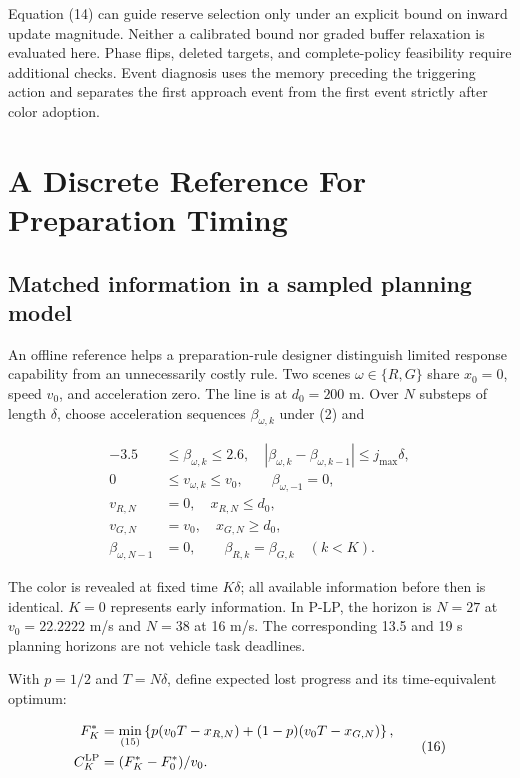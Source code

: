 \documentclass[letterpaper,journal]{IEEEtran}
\begin{document}
Equation (14) can guide reserve selection only under an explicit bound on inward update magnitude. Neither a calibrated bound nor graded buffer relaxation is evaluated here. Phase flips, deleted targets, and complete-policy feasibility require additional checks. Event diagnosis uses the memory preceding the triggering action and separates the first approach event from the first event strictly after color adoption.

\section{A Discrete Reference For Preparation Timing}

\subsection{Matched information in a sampled planning model}

An offline reference helps a preparation-rule designer distinguish limited response capability from an unnecessarily costly rule. Two scenes \(\omega\in\{R,G\}\) share \(x_0=0\), speed \(v_0\), and acceleration zero. The line is at \(d_0=200\) m. Over \(N\) substeps of length \(\delta\), choose acceleration sequences \(\beta_{\omega,k}\) under (2) and

\[\begin{aligned}
-3.5&\le\beta_{\omega,k}\le2.6,\quad
|\beta_{\omega,k}-\beta_{\omega,k-1}|\le j_{\max}\delta,\\
0&\le v_{\omega,k}\le v_0,\qquad \beta_{\omega,-1}=0,\\
v_{R,N}&=0,\quad x_{R,N}\le d_0,\\
v_{G,N}&=v_0,\quad x_{G,N}\ge d_0,\\
\beta_{\omega,N-1}&=0,\qquad
\beta_{R,k}=\beta_{G,k}\quad(k<K).
\end{aligned}\tag{15}\]

The color is revealed at fixed time \(K\delta\); all available information before then is identical. \(K=0\) represents early information. In P-LP, the horizon is \(N=27\) at \(v_0=22.2222\) m/s and \(N=38\) at 16 m/s. The corresponding 13.5 and 19 s planning horizons are not vehicle task deadlines.

With \(p=1/2\) and \(T=N\delta\), define expected lost progress and its time-equivalent optimum:

\[\begin{aligned}
F_K^*&=\min_{\text{(15)}}\left\{
p(v_0T-x_{R,N})+(1-p)(v_0T-x_{G,N})\right\},\\
C_K^{\rm LP}&=(F_K^*-F_0^*)/v_0.
\end{aligned}\tag{16}\]
\end{document}
